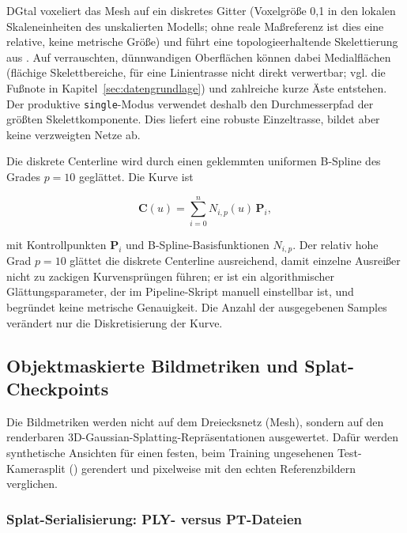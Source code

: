 DGtal voxeliert das Mesh auf ein diskretes Gitter (Voxelgröße 0,1 in den
lokalen Skaleneinheiten des unskalierten Modells; ohne reale Maßreferenz ist
dies eine relative, keine metrische Größe) und führt eine
topologieerhaltende Skelettierung aus
\parencite{dgtalProject}. Auf verrauschten, dünnwandigen Oberflächen können
dabei Medialflächen (flächige Skelettbereiche, für eine Linientrasse nicht
direkt verwertbar; vgl. die Fußnote in Kapitel~\ref{sec:datengrundlage}) und
zahlreiche kurze Äste entstehen. Der produktive
\texttt{single}-Modus verwendet deshalb den Durchmesserpfad der größten
Skelettkomponente. Dies liefert eine robuste Einzeltrasse, bildet aber keine
verzweigten Netze ab.

Die diskrete Centerline wird durch einen geklemmten uniformen B-Spline des
Grades $p=10$ geglättet. Die Kurve ist

\begin{equation}
	\mathbf{C}(u)=\sum_{i=0}^{n}N_{i,p}(u)\,\mathbf{P}_i,
	\label{eq:bspline}
\end{equation}

mit Kontrollpunkten $\mathbf{P}_i$ und B-Spline-Basisfunktionen $N_{i,p}$.
Der relativ hohe Grad $p=10$ glättet die diskrete Centerline ausreichend,
damit einzelne Ausreißer nicht zu zackigen Kurvensprüngen führen; er ist ein
algorithmischer Glättungsparameter, der im Pipeline-Skript manuell einstellbar
ist, und begründet keine metrische Genauigkeit. Die Anzahl der ausgegebenen
Samples verändert nur die Diskretisierung der Kurve.

\subsection{Objektmaskierte Bildmetriken und Splat-Checkpoints}

Die Bildmetriken werden nicht auf dem Dreiecksnetz (Mesh), sondern auf den
renderbaren 3D-Gaussian-Splatting-Repräsentationen ausgewertet. Dafür werden
synthetische Ansichten für einen festen, beim Training ungesehenen Test-Kamerasplit
() gerendert und pixelweise mit den echten Referenzbildern
verglichen.

\subsubsection*{Splat-Serialisierung: PLY- versus PT-Dateien}

